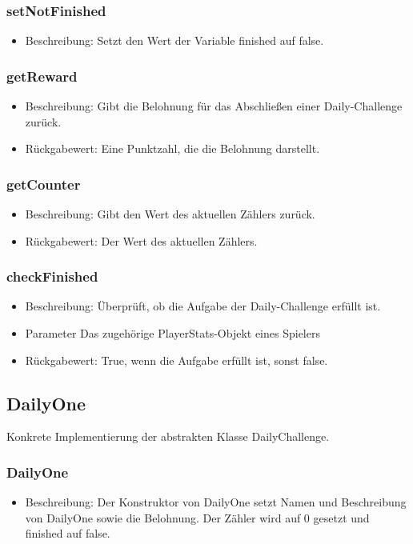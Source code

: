 \documentclass[a4paper]{scrreprt}
\begin{document}
	\subsubsection{setNotFinished}
	\begin{itemize}
		\item Beschreibung: Setzt den Wert der Variable finished auf false.
	\end{itemize}
	\subsubsection{getReward}
	\begin{itemize}
		\item Beschreibung: Gibt die Belohnung für das Abschließen einer Daily-Challenge zurück.
		\item Rückgabewert: Eine Punktzahl, die die Belohnung darstellt.
	\end{itemize}
	\subsubsection{getCounter}
	\begin{itemize}
		\item Beschreibung: Gibt den Wert des aktuellen Zählers zurück.
		\item Rückgabewert: Der Wert des aktuellen Zählers.
	\end{itemize}
	\subsubsection{checkFinished}
	\begin{itemize}
		\item Beschreibung: Überprüft, ob die Aufgabe der Daily-Challenge erfüllt ist.
		\item Parameter Das zugehörige PlayerStats-Objekt eines Spielers
		\item Rückgabewert: True, wenn die Aufgabe erfüllt ist, sonst false.
	\end{itemize}
	
	\subsection{DailyOne}
	Konkrete Implementierung der abstrakten Klasse DailyChallenge.
	\subsubsection{DailyOne}
	\begin{itemize}
		\item Beschreibung: Der Konstruktor von DailyOne setzt Namen und Beschreibung von DailyOne sowie die Belohnung. Der Zähler wird auf 0 gesetzt und finished auf false.
	\end{itemize}
\end{document}
